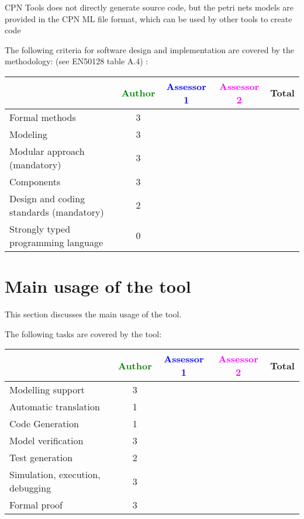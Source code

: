 CPN Tools does not directly generate source code, but the petri nets models are provided in the CPN ML file format, which can be used by other tools to create code

The following criteria for software design and implementation are covered by the methodology:
(see EN50128 table A.4) :

\begin{tabular}{|l | c | c | c | c|}
\hline
& \textcolor{green}{Author} & \textcolor{blue}{Assessor 1} & \textcolor{magenta}{Assessor 2} & Total \\
\hline
Formal methods  & 3 & & &  \\
\hline 
Modeling  & 3 & & &  \\
\hline
Modular approach (mandatory) & 3 & & &  \\
\hline
Components & 3 & & &  \\
\hline
Design and coding standards (mandatory) & 2 & & &  \\
\hline
Strongly typed programming language & 0 & & &  \\
\hline

\end{tabular}



\section{Main usage of the tool}
\label{main_usage}

This section discusses the main usage of the tool.

The following tasks are covered by the tool:


\begin{tabular}{|l | c | c | c | c|}
\hline
& \textcolor{green}{Author} & \textcolor{blue}{Assessor 1} & \textcolor{magenta}{Assessor 2} & Total \\
\hline 
Modelling support & 3 & & &  \\
\hline
Automatic translation  & 1 & & & \\
\hline
Code Generation  & 1 & & & \\
\hline
Model verification & 3 & & & \\
\hline
Test generation & 2 & & & \\
\hline
Simulation, execution, debugging & 3 & & & \\
\hline
Formal proof & 3 & & & \\
\hline
\end{tabular}

